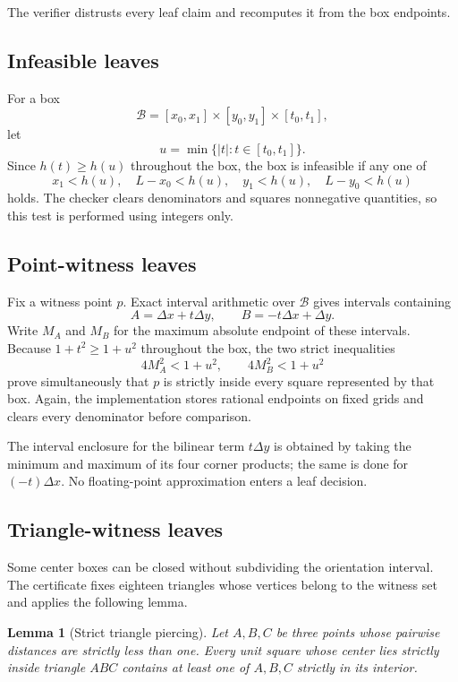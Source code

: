 \documentclass[11pt]{article}
\newtheorem{lemma}[theorem]{Lemma}
\theoremstyle{definition}
\theoremstyle{remark}
\newcommand{\abs}[1]{\left|#1\right|}
\begin{document}
The verifier distrusts every leaf claim and recomputes it from the box
endpoints.

\subsection{Infeasible leaves}

For a box
\[
  \mathcal B=[x_0,x_1]\times[y_0,y_1]\times[t_0,t_1],
\]
let
\[
  u=\min\{\abs t:t\in[t_0,t_1]\}.
\]
Since $h(t)\ge h(u)$ throughout the box, the box is infeasible if any one of
\[
  x_1<h(u),\quad L-x_0<h(u),\quad
  y_1<h(u),\quad L-y_0<h(u)
\]
holds.  The checker clears denominators and squares nonnegative quantities, so
this test is performed using integers only.

\subsection{Point-witness leaves}

Fix a witness point $p$.  Exact interval arithmetic over $\mathcal B$ gives
intervals containing
\[
  A=\Delta x+t\Delta y,
  \qquad B=-t\Delta x+\Delta y.
\]
Write $M_A$ and $M_B$ for the maximum absolute endpoint of these intervals.
Because $1+t^2\ge1+u^2$ throughout the box, the two strict inequalities
\[
  4M_A^2<1+u^2,
  \qquad 4M_B^2<1+u^2
\]
prove simultaneously that $p$ is strictly inside every square represented by
that box.  Again, the implementation stores rational endpoints on fixed grids
and clears every denominator before comparison.

The interval enclosure for the bilinear term $t\Delta y$ is obtained by taking
the minimum and maximum of its four corner products; the same is done for
$(-t)\Delta x$.  No floating-point approximation enters a leaf decision.

\subsection{Triangle-witness leaves}

Some center boxes can be closed without subdividing the orientation interval.
The certificate fixes eighteen triangles whose vertices belong to the witness
set and applies the following lemma.

\begin{lemma}[Strict triangle piercing]\label{lem:triangle}
Let $A,B,C$ be three points whose pairwise distances are strictly less than
one.  Every unit square whose center lies strictly inside triangle $ABC$
contains at least one of $A,B,C$ strictly in its interior.
\end{lemma}
\end{document}
